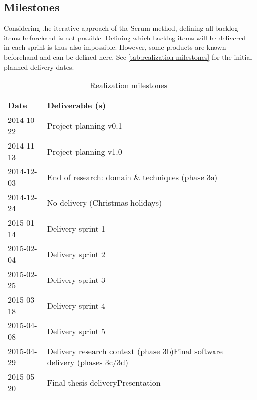 \subsection{Milestones}
Considering the iterative approach of the Scrum method, defining all backlog items beforehand is not possible.
Defining which backlog items will be delivered in each sprint is thus also impossible.
However, some products are known beforehand and can be defined here.
See \autoref{tab:realization-milestones} for the initial planned delivery dates.
%
\begin{table}[h]
  \begin{tabular}{|l|l|}\hline
    \textbf{Date} & \textbf{Deliverable (s)} \\\hline
    2014-10-22 & Project planning v0.1 \\\hline
    2014-11-13 & Project planning v1.0 \\\hline
    2014-12-03 & End of research: domain \& techniques (phase 3a) \\\hline
    2014-12-24 & No delivery (Christmas holidays) \\\hline
    2015-01-14 & Delivery sprint 1\\\hline
    2015-02-04 & Delivery sprint 2\\\hline
    2015-02-25 & Delivery sprint 3\\\hline
    2015-03-18 & Delivery sprint 4\\\hline
    2015-04-08 & Delivery sprint 5\\\hline
    2015-04-29 & Delivery research context (phase 3b)\newline{}Final software delivery (phases 3c/3d)\\\hline
    2015-05-20 & Final thesis delivery\newline{}Presentation\\\hline
  \end{tabular}
  \caption{Realization milestones}
  \label{tab:realization-milestones}
\end{table}